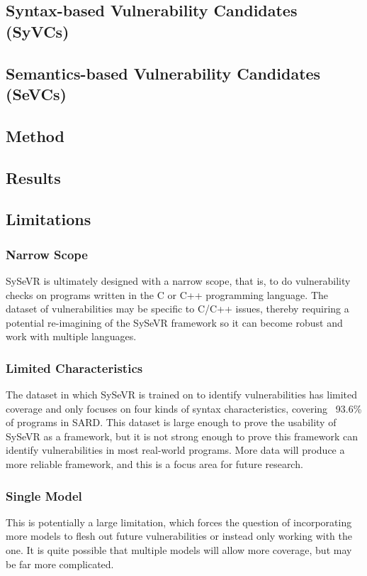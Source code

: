 \documentclass[12pt,twocolumn,letterpaper]{article}
\begin{document}
\subsection{Syntax-based Vulnerability Candidates (SyVCs)}
\subsection{Semantics-based Vulnerability Candidates (SeVCs)}

\subsection{Method}
\label{sub:method}

\subsection{Results}
\label{sub:results}








\subsection{Limitations}
\label{sub:limitations}
\subsubsection{Narrow Scope}
SySeVR is ultimately designed with a narrow scope, that is, to do vulnerability checks on programs written in
the C or C++ programming language. The dataset of vulnerabilities may be specific to C/C++ issues, thereby requiring
a potential re-imagining of the SySeVR framework so it can become robust and work with multiple languages.
\subsubsection{Limited Characteristics}
The dataset in which SySeVR is trained on to identify vulnerabilities has limited coverage and only focuses on four
kinds of syntax characteristics, covering ~93.6\% of programs in SARD. This dataset is large enough to prove the usability
of SySeVR as a framework, but it is not strong enough to prove this framework can identify vulnerabilities in most real-world
programs. More data will produce a more reliable framework, and this is a focus area for future research.
\subsubsection{Single Model}
This is potentially a large limitation, which forces the question of incorporating more models to flesh out future
vulnerabilities or instead only working with the one. It is quite possible that multiple models will allow more coverage, but
may be far more complicated.
\end{document}
